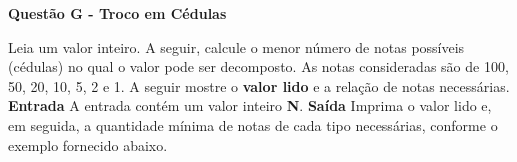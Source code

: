 \documentclass[a4paper, 12pt]{article}
\begin{document}
\newpage %
\begin{center}
\textbf{{\Large Questão G - Troco em Cédulas}}
\end{center}
\vspace{5pt}
Leia um valor inteiro. A seguir, calcule o menor número de notas possíveis  (cédulas) no qual o valor pode ser decomposto. As notas consideradas são de 100, 50, 20, 10, 5, 2 e 1. A seguir mostre o \textbf{valor lido} e a relação de notas necessárias.
\newline \newline
\textbf{{\large Entrada}} \newline
A entrada contém um valor inteiro \textbf{N}.
\newline \newline
\textbf{{\large Saída}} \newline
Imprima o valor lido e, em seguida, a quantidade mínima de notas de cada tipo necessárias, conforme o exemplo fornecido abaixo.
\newline
\end{document}
